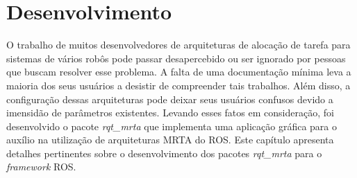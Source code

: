 \chapter[Desenvolvimento]{Desenvolvimento} \label{cap:desenvolvimento}
    O trabalho de muitos desenvolvedores de arquiteturas de alocação de tarefa para sistemas de vários robôs pode passar desapercebido ou ser ignorado por pessoas que buscam resolver esse problema. A falta de uma documentação mínima leva a maioria dos seus usuários a desistir de compreender tais trabalhos. Além disso, a configuração dessas arquiteturas pode deixar seus usuários confusos devido a imensidão de parâmetros existentes. Levando esses fatos em consideração, foi desenvolvido o pacote \textit{rqt\_mrta} que implementa uma aplicação gráfica para o auxílio na utilização de arquiteturas MRTA do ROS. Este capítulo apresenta detalhes pertinentes sobre o desenvolvimento dos pacotes \textit{rqt\_mrta} para o \textit{framework} ROS.
    
